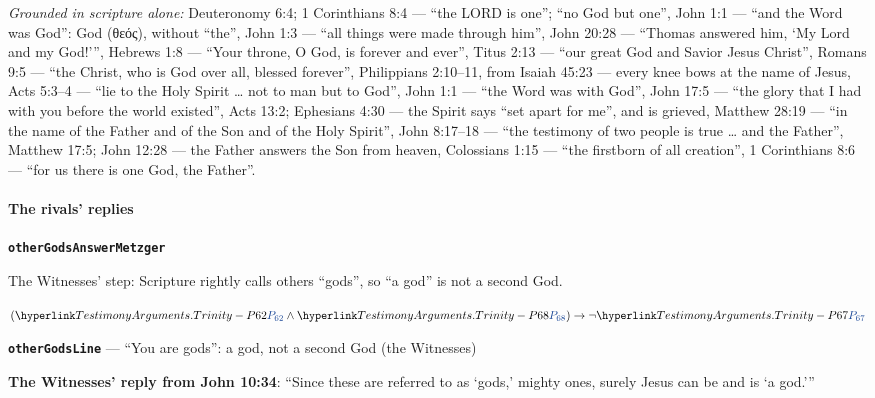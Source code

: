 \documentclass[11pt,paper=\testimonypaper,DIV=13,parskip=false]{scrartcl}
\begin{document}
\emph{Grounded in scripture alone:} Deuteronomy 6:4; 1 Corinthians 8:4 — “the LORD is one”; “no God but one”, John 1:1 — “and the Word was God”: God (θεός), without “the”, John 1:3 — “all things were made through him”, John 20:28 — “Thomas answered him, ‘My Lord and my God!’”, Hebrews 1:8 — “Your throne, O God, is forever and ever”, Titus 2:13 — “our great God and Savior Jesus Christ”, Romans 9:5 — “the Christ, who is God over all, blessed forever”, Philippians 2:10–11, from Isaiah 45:23 — every knee bows at the name of Jesus, Acts 5:3–4 — “lie to the Holy Spirit … not to man but to God”, John 1:1 — “the Word was with God”, John 17:5 — “the glory that I had with you before the world existed”, Acts 13:2; Ephesians 4:30 — the Spirit says “set apart for me”, and is grieved, Matthew 28:19 — “in the name of the Father and of the Son and of the Holy Spirit”, John 8:17–18 — “the testimony of two people is true … and the Father”, Matthew 17:5; John 12:28 — the Father answers the Son from heaven, Colossians 1:15 — “the firstborn of all creation”, 1 Corinthians 8:6 — “for us there is one God, the Father”.
\paragraph*{The rivals’ replies}
\leavevmode\par\nobreak
\par\medskip\noindent\textbf{\texttt{other\allowbreak{}Gods\allowbreak{}Answer\allowbreak{}Metzger}}\par\nobreak\noindent
The Witnesses’ step: Scripture rightly calls others “gods”, so “a god” is not a second God.

\begin{derivation}
  \item[] \((\pvar{TestimonyArguments.Trinity}{62} \land \pvar{TestimonyArguments.Trinity}{68}) \rightarrow \lnot \pvar{TestimonyArguments.Trinity}{67}\)
\end{derivation}
\par\medskip\noindent\textbf{\texttt{other\allowbreak{}Gods\allowbreak{}Line}} --- “You are gods”: a god, not a second God (the Witnesses)\par\nobreak\noindent
\textbf{The Witnesses’ reply from John 10:34}: “Since these are referred to as ‘gods,’ mighty ones, surely Jesus can be and is ‘a god.’”
\end{document}
